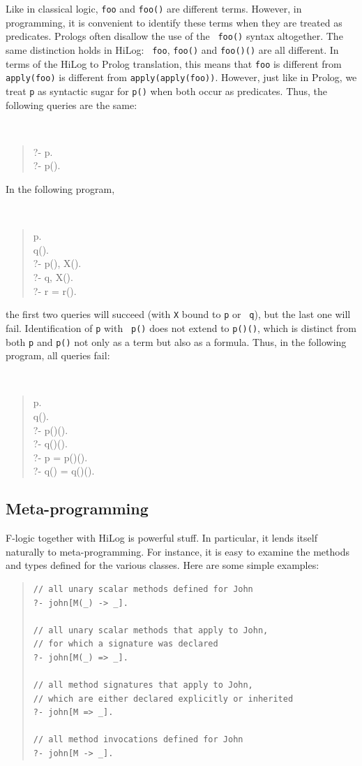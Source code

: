 \documentclass[11pt]{article}
\newcommand{\fl}{\mbox{F-logic}\xspace}
\begin{document}
%
Like in classical logic, {\tt foo} and {\tt foo()} are different terms.
However, in programming, it is convenient to identify these terms when they
are treated as predicates. Prologs often disallow the use of the {\tt
  foo()} syntax altogether.  The same distinction holds in HiLog: {\tt
  foo}, {\tt foo()} and {\tt foo()()} are all different. In terms of the
HiLog to Prolog translation, this means that {\tt foo} is different from
{\tt apply(foo)} is different from {\tt apply(apply(foo))}.  However, just
like in Prolog, we treat {\tt p} as syntactic sugar for {\tt p()} when both
occur as predicates. Thus, the following queries are the same:
{\tt
\begin{quote}
   ?- p.\\
   ?- p().
\end{quote}
}
\noindent
In the following program,
{\tt
\begin{quote}
 p. \\
 q().\\
 ?- p(), X().\\
 ?- q, X().\\
 ?- r = r().
\end{quote}
}
\noindent
the first two queries will succeed (with {\tt X} bound to {\tt p} or {\tt
  q}), but the last one will fail.  Identification of {\tt p} with {\tt
  p()} does not extend to {\tt p()()}, which is distinct from both {\tt p}
and {\tt p()} not only as a term but also as a formula. Thus, in the following
program, all queries fail:
{\tt
\begin{quote}
 p.\\
 q().\\
 ?- p()().\\
 ?- q()().\\
 ?- p = p()().\\
 ?- q() = q()().
\end{quote}
}


\subsection{Meta-programming}


%
\fl together with HiLog is powerful stuff. In particular, it lends itself
naturally to meta-programming. For instance, it is easy to examine the
methods and types defined for the various classes.  Here are some simple
examples:
\begin{quote}
\begin{verbatim}
// all unary scalar methods defined for John
?- john[M(_) -> _].

// all unary scalar methods that apply to John,
// for which a signature was declared
?- john[M(_) => _].

// all method signatures that apply to John,
// which are either declared explicitly or inherited
?- john[M => _].

// all method invocations defined for John
?- john[M -> _].
\end{verbatim}
\end{quote}
\end{document}
